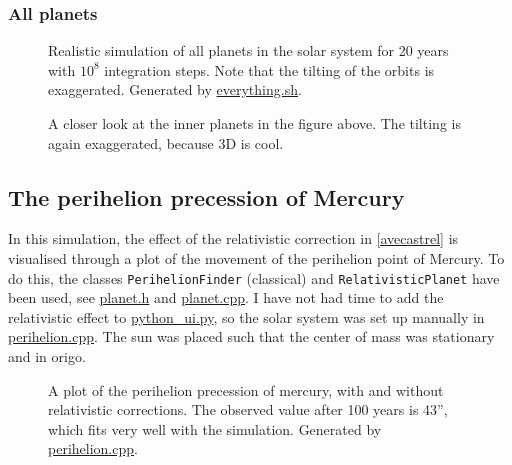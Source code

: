 \documentclass[12pt,english,a4paper]{article}
\newcommand{\program}[1]{\href{https://github.com/anjohan/Offentlig/blob/master/FYS3150/Oblig3/#1}{#1}}
\begin{document}
%
\subsubsection{All planets}
\begin{figure}[H]
\centering

\caption{Realistic simulation of all planets in the solar system for 20 years with \(10^8\) integration steps. Note that the tilting of the orbits is exaggerated. Generated by \program{everything.sh}.}
\end{figure}

\begin{figure}[H]
\centering

\caption{A closer look at the inner planets in the figure above. The tilting is again exaggerated, because 3D is cool.}
\end{figure}


\subsection{The perihelion precession of Mercury}
In this simulation, the effect of the relativistic correction in \vref{avecastrel} is visualised through a plot of the movement of the perihelion point of Mercury. To do this, the classes \texttt{PerihelionFinder} (classical) and \texttt{RelativisticPlanet} have been used, see \program{planet.h} and \program{planet.cpp}. I have not had time to add the relativistic effect to \program{python\_ui.py}, so the solar system was set up manually in \program{perihelion.cpp}. The sun was placed such that the center of mass was stationary and in origo.
\begin{figure}[H]
\centering

\caption{A plot of the perihelion precession of mercury, with and without relativistic corrections. The observed value after 100 years is 43'', which fits very well with the simulation. Generated by \program{perihelion.cpp}.}
\end{figure}


\end{document}

